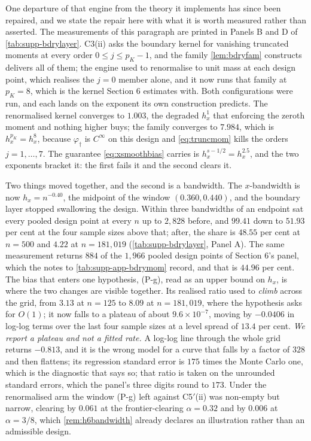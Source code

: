 \documentclass[
  12pt]{article}
\newcommand{\1}[1]{\mathds{1}\left[#1\right]}
\theoremstyle{plain}
\theoremstyle{definition}
\theoremstyle{definition}
\theoremstyle{remark}
\newcommand{\vdagger}{\varphi_{\dagger}}
\begin{document}
One departure of that engine from the theory it implements has since been
repaired, and we state the repair here with what it is worth measured rather
than asserted. The measurements of this paragraph are printed in Panels B and D
of \cref{tab:supp-bdrylayer}. C3(ii) asks the boundary kernel for vanishing
truncated moments at every order $0\le j\le p_K-1$, and the family
\cref{lem:bdryfam} constructs delivers all of them; the engine used to renormalise to unit mass at each design point,
which realises the $j=0$ member alone, and it now runs that family at $p_K=8$,
which is the kernel Section 6 estimates with. Both configurations were run, and
each lands on the exponent its own construction predicts. The renormalised
kernel converges to $1.003$, the degraded $h_x^{1}$ that enforcing the zeroth
moment and nothing higher buys; the family converges to $7.984$, which is
$h_x^{p_K}=h_x^{8}$, because $\vdagger$ is $C^\infty$ on this design and
\eqref{eq:truncmom} kills the orders $j=1,\dots,7$. The guarantee \eqref{eq:xsmoothbias} carries
is $h_x^{s-1/2}=h_x^{2.5}$, and the two exponents bracket it: the first
fails it and the second clears it.

Two things moved together, and the second is a bandwidth. The $x$-bandwidth is
now $h_x=n^{-0.40}$, the midpoint of the window $(0.360,0.440)$, and the
boundary layer stopped swallowing the design. Within three bandwidths of an
endpoint sat every pooled design point at every $n$ up to $2{,}828$ before, and
$99.41$ down to $51.93$ per cent at the four sample sizes above that; after, the
share is $48.55$ per cent at $n=500$ and $4.22$ at $n=181{,}019$
(\cref{tab:supp-bdrylayer}, Panel A). The same measurement returns $884$ of the
$1{,}966$ pooled design points of Section 6's panel, which the notes to \cref{tab:supp-app-bdrymom} record, and that is $44.96$ per cent.
The bias that enters one hypothesis, (P-g), read as an upper bound on $h_x$, is
where the two changes are visible together. Its realised ratio used to
\emph{climb} across the grid, from $3.13$ at $n=125$ to $8.09$ at
$n=181{,}019$, where the hypothesis asks for $O(1)$; it now falls to a plateau
of about $9.6\times10^{-7}$, moving by $-0.0406$ in log-log terms over the last
four sample sizes at a level spread of $13.4$ per cent. \emph{We report a plateau and
not a fitted rate.} A log-log line through the whole grid returns $-0.813$, and
it is the wrong model for a curve that falls by a factor of $328$ and then
flattens; its regression standard error is $175$ times the Monte Carlo one,
which is the diagnostic that says so; that ratio is taken on the unrounded
standard errors, which the panel's three digits round to $173$. Under the renormalised arm the window
(P-g) left against C5$'$(ii) was non-empty but narrow, clearing by $0.061$ at
the frontier-clearing $\alpha=0.32$ and by $0.006$ at $\alpha=3/8$, which
\cref{rem:h6bandwidth} already declares an illustration rather than an
admissible design.
\end{document}
